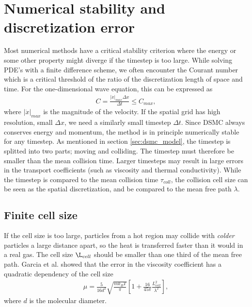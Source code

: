 \section{Numerical stability and discretization error}
\label{sec:dsmc_stability}
Most numerical methods have a critical stability criterion where the energy or some other property might diverge if the timestep is too large. While solving PDE's with a finite difference scheme, we often encounter the Courant number which is a critical threshold of the ratio of the discretization length of space and time. For the one-dimensional wave equation, this can be expressed as
\begin{align}
	C = \frac{|\dot x|_{max} \Delta x}{\Delta t} \leq C_{max},
\end{align}
where $|\dot x|_{max}$ is the magnitude of the velocity. If the spatial grid has high resolution, small $\Delta x$, we need a similarly small timestep $\Delta t$. Since DSMC always conserves energy and momentum, the method is in principle numerically stable for any timestep. As mentioned in section \ref{sec:dsmc_model}, the timestep is splitted into two parts; moving and colliding. The timestep must therefore be smaller than the mean collision time. Larger timesteps may result in large errors in the transport coefficients (such as viscosity and thermal conductivity)\cite{karniadakis2005microflows}. While the timestep is compared to the mean collision time $\tau_{coll}$, the collision cell size can be seen as the spatial discretization, and be compared to the mean free path $\lambda$. 
\subsection{Finite cell size}
If the cell size is too large, particles from a hot region may collide with \textit{colder} particles a large distance apart, so the heat is transferred faster than it would in a real gas. The cell size $\L_{cell}$ should be smaller than one third of the mean free path\cite{karniadakis2005microflows}. Garcia et al. \cite{alexander1998cell} showed that the error in the viscosity coefficient has a quadratic dependency of the cell size
\begin{align}
	\label{eq:viscosity_cell_size}
	\mu = \frac{5}{16d^2}\sqrt{\frac{mk_B T}{\pi}} \left [1 + \frac{16}{45\pi}\frac{L_{cell}^2}{\lambda^2}\right],
\end{align}
where $d$ is the molecular diameter. 
